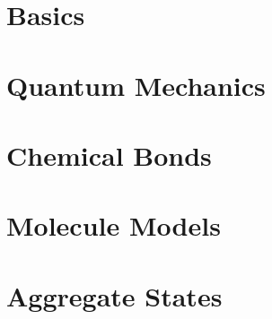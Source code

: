 \documentclass{cheatsheet}
\begin{document}

\section{Basics}
    
    
    
\section{Quantum Mechanics}
    
    
\section{Chemical Bonds}
    
    
    
    
    
\section{Molecule Models}
    
\section{Aggregate States}
    
    
    
    
\end{document}
